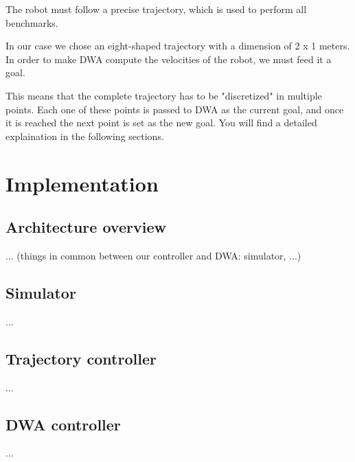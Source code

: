 \documentclass[11pt,a4paper]{article}
\begin{document}
The robot must follow a precise trajectory, which is used to perform all benchmarks.

In our case we chose an eight-shaped trajectory with a dimension of 2 x 1 meters.\\

In order to make DWA compute the velocities of the robot, we must feed it a goal.

This means that the complete trajectory has to be "discretized" in multiple points.
Each one of these points is passed to DWA as the current goal, and once it is reached the next point is set as the new goal. You will find a detailed explaination in the following sections.




\section{Implementation}

\subsection{Architecture overview}

... (things in common between our controller and DWA: simulator, ...)

\subsection{Simulator}

...

\subsection{Trajectory controller}

...

\subsection{DWA controller}

...



%
\end{document}
